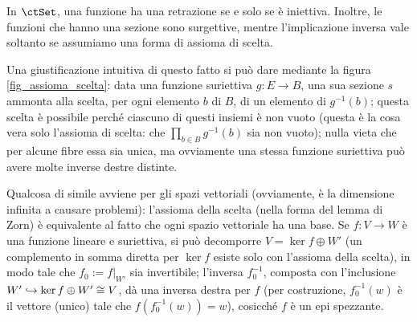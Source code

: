 \begin{example}
	\label{exm:set-sezioni-retrazioni}
	In \(\ctSet\), una funzione ha una retrazione se e solo se è iniettiva.
	Inoltre, le funzioni che hanno una sezione sono surgettive,
	mentre l'implicazione inversa vale soltanto se assumiamo una forma di assioma di scelta.

	Una giustificazione intuitiva di questo fatto si può dare mediante la figura \ref{fig_assioma_scelta}: data una funzione suriettiva \(g : E\to B\), una sua sezione \(s\) ammonta alla scelta, per ogni elemento \(b\) di \(B\), di un elemento di \(g^{-1}(b)\); questa scelta è possibile perché ciascuno di questi insiemi è non vuoto (questa è la cosa vera solo l'assioma di scelta: che \(\prod_{b\in B}g^{-1}(b)\) sia non vuoto); nulla vieta che per alcune fibre essa sia unica, ma ovviamente una stessa funzione suriettiva può avere molte inverse destre distinte.
\end{example}
\begin{remark}
	Qualcosa di simile avviene per gli spazi vettoriali (ovviamente, è la dimensione infinita a causare problemi): l'assioma della scelta (nella forma del lemma di Zorn) è equivalente al fatto che ogni spazio vettoriale ha una base. Se \(f : V\to W\) è una funzione lineare e suriettiva, si può decomporre \(V = \ker f \oplus W'\) (un complemento in somma diretta per \(\ker f\) esiste solo con l'assioma della scelta), in modo tale che \(f_0 := f|_{W'}\) sia invertibile; l'inversa \(f_0^{-1}\), composta con l'inclusione \(W'\hookrightarrow \ker f \oplus W'\cong V\), dà una inversa destra per \(f\) (per costruzione, \(f_0^{-1}(w)\) è il vettore (unico) tale che \(f(f_0^{-1}(w)) = w\)), cosicché \(f\) è un epi spezzante.
\end{remark}
